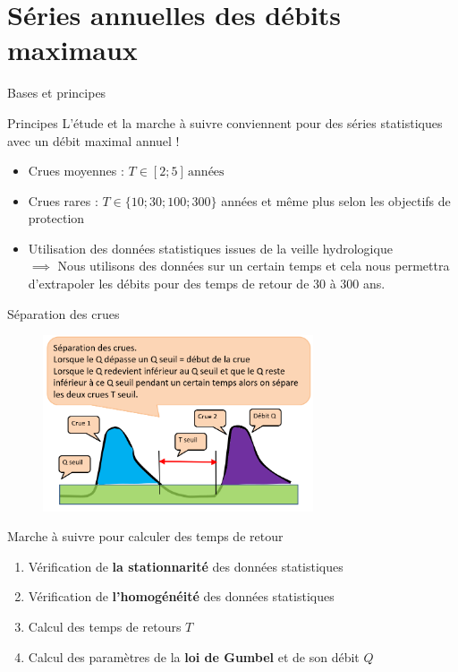\documentclass{beamer}
\begin{document}
\section{Séries annuelles des débits maximaux}
\begin{frame}{Bases et principes}
    \begin{alertblock}{Principes}
        L'étude et la marche à suivre conviennent pour des séries statistiques avec un débit maximal annuel !
    \end{alertblock}
    \begin{itemize}[label=$\rhd$]
        \item Crues moyennes : $T \in [2;5] \, \text{années}$
        \item Crues rares : $T \in \{10;30;100;300\}$ années et même plus selon les objectifs de protection
        \item Utilisation des données statistiques issues de la veille hydrologique \\
        $\implies$ Nous utilisons des données sur un certain temps et cela nous permettra d'extrapoler les débits pour des temps de retour de 30 à 300 ans.
    \end{itemize}
\end{frame}

\begin{frame}{Séparation des crues}
    \begin{figure}
        \centering
        \includegraphics[width=8cm]{separationCrue.png}
    \end{figure}
\end{frame}

\begin{frame}{Marche à suivre pour calculer des temps de retour}
    \begin{enumerate}
        \item Vérification de \textbf{la stationnarité} des données statistiques
        \item Vérification de \textbf{l'homogénéité} des données statistiques
        \item Calcul des temps de retours $T$
        \item Calcul des paramètres de la \textbf{loi de Gumbel} et de son débit $Q$
    \end{enumerate}
\end{frame}
\end{document}
